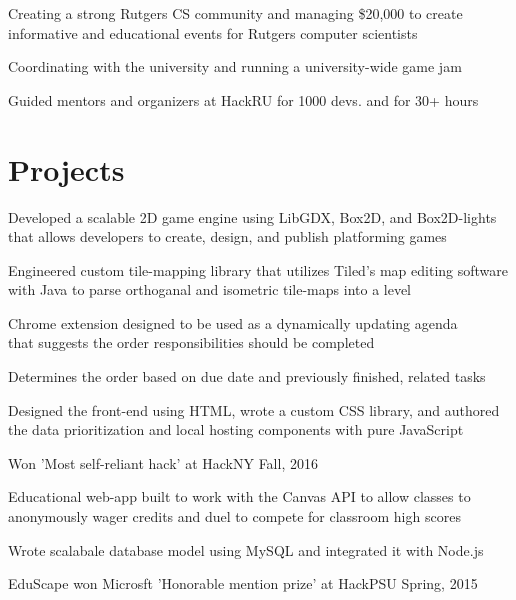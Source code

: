 \documentclass[]{deedy-resume-openfont}
\begin{document}
\begin{minipage}[t]{0.66\textwidth}
\begin{tightemize}
\item Creating a strong Rutgers CS community and managing \$20,000 to create informative and educational events for Rutgers computer scientists
\item Coordinating with the university and running a university-wide  game jam
\item Guided mentors and organizers at HackRU for 1000 devs. and for 30+ hours
\end{tightemize}
\sectionsep


\section{Projects}
\begin{tightemize}
\item Developed a scalable 2D game engine using LibGDX, Box2D, and Box2D-lights that allows developers to create, design, and publish platforming games
\item Engineered custom tile-mapping library that utilizes  Tiled's map editing software with Java to parse orthoganal and isometric tile-maps into a level   
\end{tightemize}
\sectionsep

\begin{tightemize}
\item Chrome extension designed to be used as a dynamically updating agenda \\that suggests the order responsibilities should be completed 
\item Determines the order based on due date and previously finished, related tasks
\item Designed the front-end using HTML, wrote a custom CSS library, and authored \\the data prioritization and local hosting components with pure JavaScript 
\item Won 'Most self-reliant hack' at HackNY Fall, 2016
\end{tightemize}
\sectionsep

\begin{tightemize}
\item Educational web-app built to work with the Canvas API to allow classes to anonymously wager credits and duel to compete for classroom high scores
\item Wrote scalabale database model using MySQL and integrated it with Node.js 
\item EduScape won Microsft 'Honorable mention prize' at HackPSU Spring, 2015
\end{tightemize}
\sectionsep

\end{minipage} 
\end{document}
